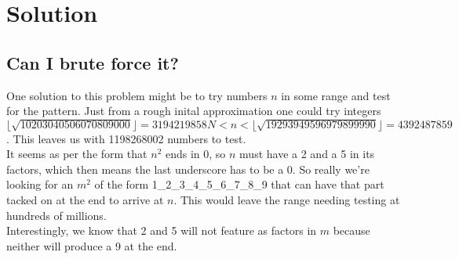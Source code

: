 \section{Solution}

\subsection{Can I brute force it?}

One solution to this problem might be to try numbers $n$ in some range and test for the pattern.  Just from a rough inital
approximation one could try integers 
$\lfloor\sqrt{10203040506070809000}\rfloor = 3194219858N < n < \lfloor\sqrt{19293949596979899990}\rfloor = 4392487859$.  
This leaves us with 1198268002 numbers to test.\\

It seems as per the form that $n^2$ ends in 0, so $n$ must have a 2 and a 5 in its factors, which then means the last
 underscore has to be a 0.  So really we're looking for an $m^2$ of the form 1\_2\_3\_4\_5\_6\_7\_8\_9 that can have
 that part tacked on at the end to arrive at $n$.  This would leave the range needing testing at hundreds of millions. \\

Interestingly, we know that 2 and 5 will not feature as factors in $m$ because neither will produce a 9 at the end. \\